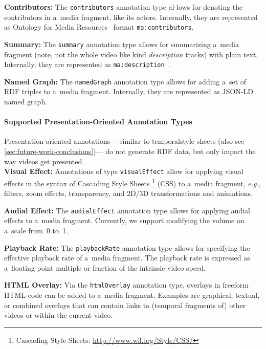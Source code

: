 \documentclass{sig-alternate}
\newcommand{\inlinelistingsize}{\fontsize{8pt}{11pt}}
\let\oldurl\url
\renewcommand{\url}[1]{\inlinelistingsize\oldurl{#1}}
\def\JSONLD{\mbox{JSON-LD}}
\begin{document}
\noindent \textbf{Contributors:} The \texttt{contributors} annotation type
  al-\linebreak lows for denoting the contributors in a~media fragment, like its actors.
  Internally, they are represented as
  Ontology for Media Resources~\cite{lee2012mediaontology}
  format \texttt{ma:contributors}.

\noindent \textbf{Summary:} The \texttt{summary} annotation type
  allows for summarizing a~media fragment
  (note, not the whole video like kind \emph{description} tracks)
  with plain text.
  Internally, they are represented as  
  \texttt{ma:description}~\cite{lee2012mediaontology}.

\noindent \textbf{Named Graph:} The \texttt{namedGraph} annotation type
  allows for adding a~set of RDF triples
  to a~media fragment.
  Internally, they are represented as \JSONLD%
  ~\cite{sporny2013jsonld} named graph.

\paragraph{Supported Presentation-Oriented Annotation Types}

Presentation-oriented annotations---%
similar to temporal\linebreak style sheets
(also see \autoref{sec:future-work-conclusions})---%
do not generate RDF data,
but only impact the way videos get presented.\\

\noindent \textbf{Visual Effect:} Annotations of
  type \texttt{visualEffect} allow for applying visual effects
  in the syntax of Cascading Style Sheets%
  \footnote{Cascading Style Sheets:
  \url{http://www.w3.org/Style/CSS/}} (CSS)
  to a~media fragment, \emph{e.g.},
  filters, zoom effects, transparency,
  and 2D/3D transformations and animations.

\noindent \textbf{Audial Effect:} The \texttt{audialEffect} annotation type
  allows for applying audial effects to a~media fragment.
  Currently, we support modifying the volume on a~scale
  from~0 to~1.

\noindent \textbf{Playback Rate:} The \texttt{playbackRate}
  annotation type allows for specifying the effective
  playback rate of a~media fragment.
  The playback rate is expressed as a~floating point
  multiple or fraction of the intrinsic video speed.

\noindent \textbf{HTML Overlay:} Via the \texttt{htmlOverlay}
  annotation type, overlays in
  freeform HTML code can be added to a~media fragment.
  Examples are graphical, textual, or combined overlays
  that can contain links to (temporal fragments of)
  other videos or within the current video.
\end{document}
